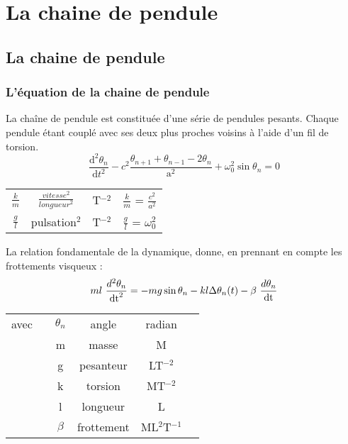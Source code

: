 \section{La chaine de pendule}
\subsection{La chaine de pendule}
\label{chaineDePendule}
\subsubsection{L'équation de la chaine de pendule}
La chaîne de pendule est constituée d'une série de pendules pesants. Chaque pendule étant couplé avec ses deux plus proches voisins à l'aide d'un fil de torsion.\cite{sine-gordon}\cite{chaine-pendule}
\[
\frac{\mathrm d^2\theta _n}{\mathrm d t^2} - c^2 \frac{\theta _{n+1} + \theta _{n-1} - 2 \theta _n}{\mathrm{a} ^2} + \omega _0 ^2 \sin \theta _n = 0
\]
%
\begin{center}
\begin{tabular}{cccc}
$\frac{k}{m}$ & $\frac{vitesse^2}{longueur^2}$ & T$^{-2}$ & $\frac{k}{m}$ = $\frac{c^2}{a^2}$ \\
$\frac{g}{l}$& pulsation$^2$ & T$^{-2}$ & $\frac{g}{l}$ = $\omega _0 ^2$ \\
\end{tabular}
\end{center}
%

La relation fondamentale de la dynamique, donne, en prennant en compte les frottements visqueux :
%
\[
m l\ \frac{d^2 \theta _n}{\dt^2} =  - m g \sin{\theta _n}  -  k l \Delta \theta _n(t)  -  \beta\ \frac{d \theta _n}{\dt}
\]
%
\begin{center}
\begin{tabular}{cccccc}
avec & & $\theta _n$ & angle & radian &  \\
 & & m & masse & M &  \\
 & & g & pesanteur & LT$^{-2}$ &  \\
 & & k & torsion & MT$^{-2}$ &  \\
 & & l & longueur & L &  \\
 & & $\beta$ & frottement & ML$^{2}$T$^{-1}$ &  \\
\end{tabular}
\end{center}
%
